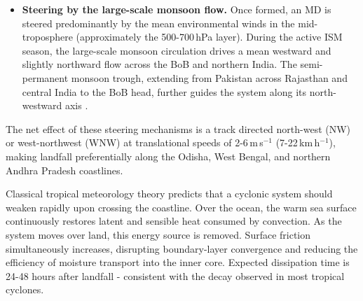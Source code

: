 \begin{itemize}
  \item \textbf{Steering by the large-scale monsoon flow.} Once formed,
    an MD is steered predominantly by the mean environmental winds in
    the mid-troposphere (approximately the 500-700\,hPa layer). During
    the active ISM season, the large-scale monsoon circulation drives
    a mean westward and slightly northward flow across the BoB and
    northern India. The semi-permanent monsoon trough, extending from
    Pakistan across Rajasthan and central India to the BoB head,
    further guides the system along its north-westward axis
    \citep{mishra2021monsoon, sikka1977}.
\end{itemize}

The net effect of these steering mechanisms is a track directed
north-west (NW) or west-northwest (WNW) at translational speeds of
2-6\,m\,s$^{-1}$ (7-22\,km\,h$^{-1}$), making landfall preferentially
along the Odisha, West Bengal, and northern Andhra Pradesh coastlines.

Classical tropical meteorology theory predicts that a cyclonic system
should weaken rapidly upon crossing the coastline. Over the ocean,
the warm sea surface continuously restores latent and sensible heat
consumed by convection. As the system moves over land, this energy
source is removed. Surface friction simultaneously increases,
disrupting boundary-layer convergence and reducing the efficiency of
moisture transport into the inner core. Expected dissipation time is
24-48 hours after landfall - consistent with the decay observed in
most tropical cyclones.


